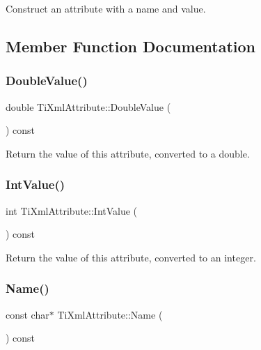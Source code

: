 Construct an attribute with a name and value. 



\subsection{Member Function Documentation}
\mbox{\label{class_ti_xml_attribute_a8cca240fb2a7130c87b0fc6156e8b34f}} 
\subsubsection{\texorpdfstring{Double\+Value()}{DoubleValue()}}
{\footnotesize\ttfamily double Ti\+Xml\+Attribute\+::\+Double\+Value (\begin{DoxyParamCaption}{ }\end{DoxyParamCaption}) const}



Return the value of this attribute, converted to a double. 

\mbox{\label{class_ti_xml_attribute_ac8501370b065df31a35003c81d87cef2}} 
\subsubsection{\texorpdfstring{Int\+Value()}{IntValue()}}
{\footnotesize\ttfamily int Ti\+Xml\+Attribute\+::\+Int\+Value (\begin{DoxyParamCaption}{ }\end{DoxyParamCaption}) const}



Return the value of this attribute, converted to an integer. 

\mbox{\label{class_ti_xml_attribute_a008ef948268ee752b58c60d63d84bb01}} 
\subsubsection{\texorpdfstring{Name()}{Name()}}
{\footnotesize\ttfamily const char$\ast$ Ti\+Xml\+Attribute\+::\+Name (\begin{DoxyParamCaption}{ }\end{DoxyParamCaption}) const\hspace{0.3cm}{\ttfamily [inline]}}




